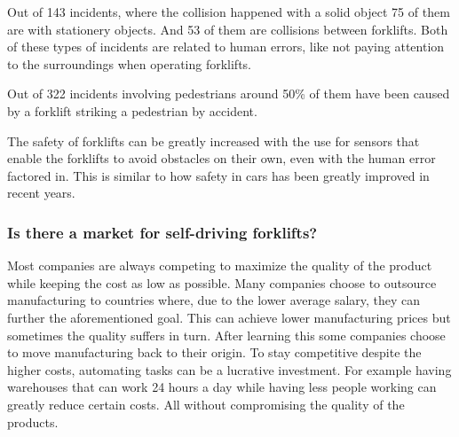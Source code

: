 \documentclass[../report.tex]{subfiles}
\begin{document}
    Out of 143 incidents, where the collision happened with a solid object
    75 of them are with stationery objects. And 53 of them are collisions 
    between forklifts. Both of these types of incidents are related to 
    human errors, like not paying attention to the surroundings when 
    operating forklifts.

    Out of 322 incidents involving pedestrians around 50\% of them have 
    been caused by a forklift striking a pedestrian by accident.

    The safety of forklifts can be greatly increased with the use for sensors that
    enable the forklifts to avoid obstacles on their own, even with the human 
    error factored in. This is similar to how safety in cars has been greatly
    improved in recent years.

    \subsubsection{Is there a market for self-driving forklifts?}
    Most companies are always competing to maximize the quality of the product 
    while keeping the cost as low as possible. Many companies choose
    to outsource manufacturing to countries where, due to the lower
    average salary, they can further the aforementioned goal.
    This can achieve lower manufacturing prices but sometimes 
    the quality suffers in turn. After learning this some companies
    choose to move manufacturing back to their origin. To stay
    competitive despite the higher costs, automating tasks can be
    a lucrative investment. For example having warehouses that can
    work 24 hours a day while having less people working can greatly reduce certain costs. All without
    compromising the quality of the products.
\end{document}
